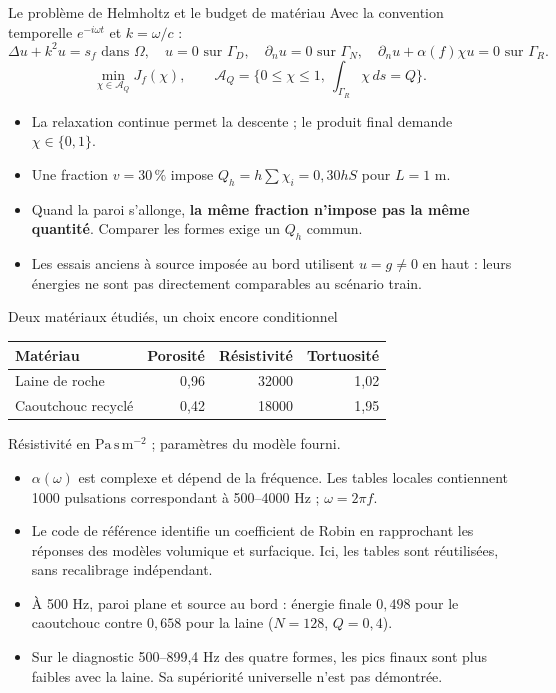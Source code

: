 \begin{frame}{Le problème de Helmholtz et le budget de matériau}
\small Avec la convention temporelle $e^{-i\omega t}$ et $k=\omega/c$ :
\[
 \Delta u+k^2u=s_f\text{ dans }\Omega,\quad
 u=0\text{ sur }\Gamma_D,\quad \partial_nu=0\text{ sur }\Gamma_N,
 \quad \partial_nu+\alpha(f)\chi u=0\text{ sur }\Gamma_R.
\]
\[
 \min_{\chi\in\mathcal A_Q}J_f(\chi),\qquad
 \mathcal A_Q=\{0\leq\chi\leq1,\ \int_{\Gamma_R}\chi\,ds=Q\}.
\]
\begin{itemize}
\item La relaxation continue permet la descente ; le produit final demande $\chi\in\{0,1\}$.
\item Une fraction $v=30\,\%$ impose $Q_h=h\sum\chi_i=0{,}30hS$ pour $L=1$ m.
\item Quand la paroi s'allonge, \textbf{la même fraction n'impose pas la même quantité}. Comparer les formes exige un $Q_h$ commun.
\item Les essais anciens à source imposée au bord utilisent $u=g\neq0$ en haut : leurs énergies ne sont pas directement comparables au scénario train.
\end{itemize}
\end{frame}

\begin{frame}{Deux matériaux étudiés, un choix encore conditionnel}
\small
\begin{center}
\begin{tabular}{lrrr}
\toprule Matériau & Porosité & Résistivité & Tortuosité\\
\midrule Laine de roche & 0,96 & 32000 & 1,02\\
Caoutchouc recyclé & 0,42 & 18000 & 1,95\\\bottomrule
\end{tabular}
\end{center}
Résistivité en $\mathrm{Pa\,s\,m^{-2}}$ ; paramètres du modèle fourni.
\begin{itemize}
\item $\alpha(\omega)$ est complexe et dépend de la fréquence. Les tables locales contiennent 1000 pulsations correspondant à 500--4000 Hz ; $\omega=2\pi f$.
\item Le code de référence identifie un coefficient de Robin en rapprochant les réponses des modèles volumique et surfacique. Ici, les tables sont réutilisées, sans recalibrage indépendant.
\item À 500 Hz, paroi plane et source au bord : énergie finale $0{,}498$ pour le caoutchouc contre $0{,}658$ pour la laine ($N=128$, $Q=0{,}4$).
\item Sur le diagnostic 500--899,4 Hz des quatre formes, les pics finaux sont plus faibles avec la laine. Sa supériorité universelle n'est pas démontrée.
\end{itemize}
\end{frame}

